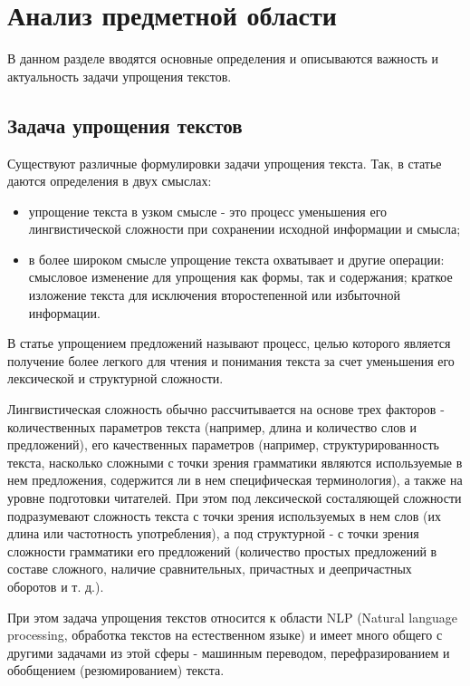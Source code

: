 \chapter{Анализ предметной области}

В данном разделе вводятся основные определения и описываются важность и актуальность задачи упрощения текстов.

\section{Задача упрощения текстов}


Существуют различные формулировки задачи упрощения текста. 
Так, в статье \cite{siddharthan_survey_2014} даются определения в двух смыслах:
\begin{itemize}
	\item упрощение текста в узком смысле - это процесс уменьшения его лингвистической сложности при сохранении исходной информации и смысла;
	\item в более широком смысле упрощение текста охватывает и другие операции: смысловое изменение для упрощения как формы, так и содержания; краткое изложение текста для исключения второстепенной или избыточной информации.
\end{itemize}

В статье \cite{martin_muss_2021} упрощением предложений называют процесс, целью которого является получение более легкого для чтения и понимания текста за счет уменьшения его лексической и структурной сложности.


Лингвистическая сложность обычно рассчитывается на основе трех факторов - количественных параметров текста (например, длина и количество слов и предложений), его качественных параметров (например, структурированность текста, насколько сложными с точки зрения грамматики являются используемые в нем предложения, содержится ли в нем специфическая терминология), а также на уровне подготовки читателей\cite{diff}. При этом под лексической состаляющей сложности подразумевают сложность текста с точки зрения используемых в нем слов (их длина или частотность употребления), а под структурной - с точки зрения сложности грамматики его предложений (количество простых предложений в составе сложного, наличие сравнительных, причастных и деепричастных оборотов и т. д.)\cite{2parts}.




При этом задача упрощения текстов относится к области NLP (Natural language processing, обработка текстов на естественном языке) и имеет много общего с другими задачами из этой сферы - машинным переводом, перефразированием и обобщением (резюмированием) текста\cite{zhu_monolingual_2010}. 

